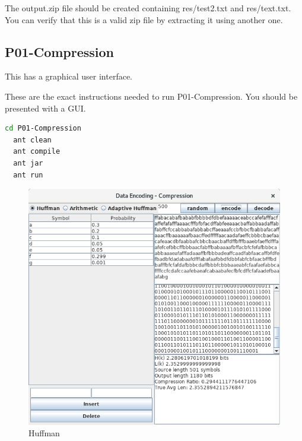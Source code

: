 \documentclass{article}
\begin{document}
The output.zip file should be created containing res/test2.txt and res/text.txt. You can verify that this is a valid zip file by extracting it using another one.


\subsection{P01-Compression}

This has a graphical user interface.

These are the exact instructions needed to run P01-Compression. You should be presented with a GUI.

\begin{lstlisting}[language=bash]
  cd P01-Compression
  ant clean
  ant compile
  ant jar
  ant run
\end{lstlisting}

\begin{figure}[h]
  \includegraphics[scale=0.3]{images/gui_b.png}
  \caption{Huffman}
  \label{fig:gui_huffman}
\end{figure}
\end{document}
